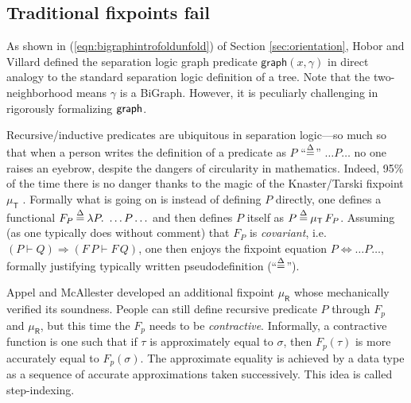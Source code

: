 

\subsection{Traditional fixpoints fail}\label{sec:fixpointfail}

As shown in (\ref{eqn:bigraphintrofoldunfold}) of Section
\ref{sec:orientation}, Hobor and Villard\cite{hobor:ramification}
defined the separation logic graph predicate
$\mathsf{graph}(x,\gamma)$ in direct analogy to the standard
separation logic definition of a tree. Note that the two-neighborhood
means $\gamma$ is a BiGraph. However, it is peculiarly challenging in
rigorously formalizing $\mathsf{graph}$.


Recursive/inductive predicates are ubiquitous in separation logic---so
much so that when a person writes the definition of a predicate as $P$
``$\mathbin{\stackrel{\Delta}{=}}$'' $\ldots P \ldots$ no one raises an eyebrow, despite the
dangers of circularity in mathematics. Indeed, 95\% of the time there
is no danger thanks to the magic of the Knaster/Tarski fixpoint
$\mu_{\mathsf{T}}$ \cite{tarski:fixpoint}. Formally what is going on
is instead of defining $P$ directly, one defines a functional $F_P
\mathbin{\stackrel{\Delta}{=}} \lambda P.~ \ldots P \ldots$ and then defines $P$ itself as $P
\mathbin{\stackrel{\Delta}{=}} \mu_{\mathsf{T}} \, F_P$.  Assuming (as one typically does
without comment) that $F_P$ is \emph{covariant}, i.e. $(P \vdash Q)
\Rightarrow (F \, P \vdash F \, Q)$, one then enjoys the fixpoint
equation $P \Leftrightarrow \ldots P \ldots$, formally justifying
typically written pseudodefinition (``$\mathbin{\stackrel{\Delta}{=}}$'').

Appel and McAllester developed an additional fixpoint
$\mu_{\mathsf{R}}$ \cite{appel:fixpoint} whose \cite{appel:vmm}
mechanically verified its soundness. People can still define recursive
predicate $P$ through $F_p$ and $\mu_{\mathsf{R}}$, but this time the
$F_p$ needs to be \emph{contractive}. Informally, a contractive
function is one such that if $\tau$ is approximately equal to
$\sigma$, then $F_p(\tau)$ is more accurately equal to
$F_p(\sigma)$. The approximate equality is achieved by a data type as
a sequence of accurate approximations taken successively. This idea is
called step-indexing.


